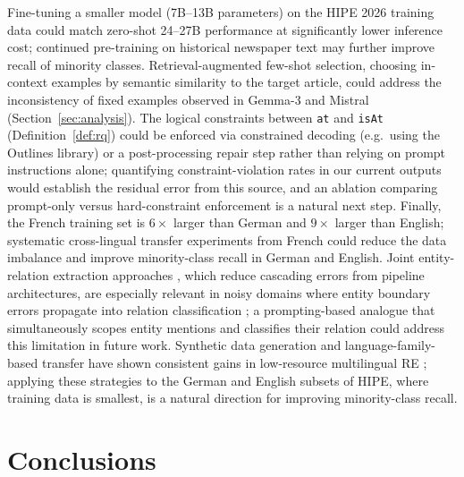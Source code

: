 \documentclass[
]{ceurart}
\theoremstyle{definition}
\begin{document}
Fine-tuning a smaller model (7B--13B parameters) on the HIPE 2026 training data could match zero-shot 24--27B performance at significantly lower inference cost; continued pre-training on historical newspaper text may further improve recall of minority classes.
Retrieval-augmented few-shot selection, choosing in-context examples by semantic similarity to the target article, could address the inconsistency of fixed examples observed in Gemma-3 and Mistral (Section~\ref{sec:analysis}).
The logical constraints between \texttt{at} and \texttt{isAt} (Definition~\ref{def:rq}) could be enforced via constrained decoding (e.g.\ using the Outlines library) or a post-processing repair step rather than relying on prompt instructions alone; quantifying constraint-violation rates in our current outputs would establish the residual error from this source, and an ablation comparing prompt-only versus hard-constraint enforcement is a natural next step.
Finally, the French training set is $6\times$ larger than German and $9\times$ larger than English; systematic cross-lingual transfer experiments from French could reduce the data imbalance and improve minority-class recall in German and English.
Joint entity-relation extraction approaches \citep{li-etal-2019-entity}, which reduce cascading errors from pipeline architectures, are especially relevant in noisy domains where entity boundary errors propagate into relation classification \citep{ali2025multilingual}; a prompting-based analogue that simultaneously scopes entity mentions and classifies their relation could address this limitation in future work.
Synthetic data generation and language-family-based transfer have shown consistent gains in low-resource multilingual RE \citep{ali2025multilingual}; applying these strategies to the German and English subsets of HIPE, where training data is smallest, is a natural direction for improving minority-class recall.


\section{Conclusions}\label{sec:conclusions}
\end{document}
